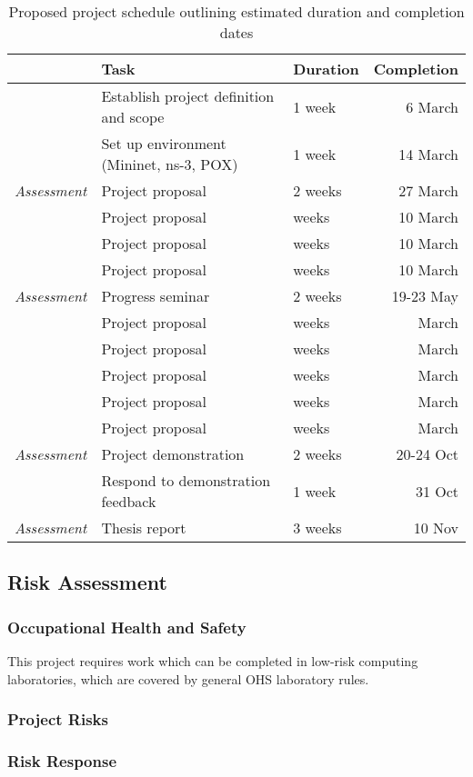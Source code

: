 \documentclass[pdftex,12pt,a4paper]{article}
\begin{document}
\begin{table}[H]
\begin{center}
\begin{tabular}{@{}rllr@{}}
\toprule
& Task & Duration & Completion\\
\midrule
& Establish project definition and scope & 1 week & 6 March \\
& Set up environment (Mininet, ns-3, POX) & 1 week & 14 March \\
\emph{Assessment} & Project proposal & 2 weeks & 27 March \\
& Project proposal & weeks & 10 March \\
& Project proposal & weeks & 10 March \\
& Project proposal & weeks & 10 March \\
\emph{Assessment} & Progress seminar & 2 weeks & 19-23 May \\
& Project proposal & weeks & March \\
& Project proposal & weeks & March \\
& Project proposal & weeks & March \\
& Project proposal & weeks & March \\
& Project proposal & weeks & March \\
\emph{Assessment} & Project demonstration & 2 weeks & 20-24 Oct \\
& Respond to demonstration feedback & 1 week & 31 Oct \\
\emph{Assessment} & Thesis report & 3 weeks & 10 Nov \\
\bottomrule
\end{tabular}
\caption{Proposed project schedule outlining estimated duration and completion dates}
\end{center}
\end{table}

\subsection{Risk Assessment}
\subsubsection{Occupational Health and Safety}
This project requires work which can be completed in low-risk computing laboratories, which are covered by general OHS laboratory rules.

\subsubsection{Project Risks}
\subsubsection{Risk Response}

\newpage


\end{document}
